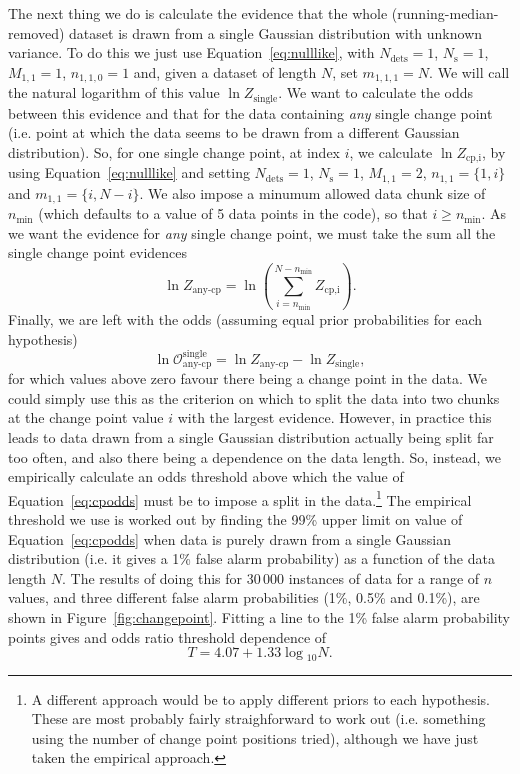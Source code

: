 The next thing we do is calculate the evidence that the whole (running-median-removed) dataset is drawn from a single
Gaussian distribution with unknown variance. To do this we just use Equation~\ref{eq:nulllike}, with $N_{\text{dets}} =1$,
$N_{\text{s}}=1$, $M_{1,1}=1$, $n_{1,1,0}=1$ and, given a dataset of length $N$, set $m_{1,1,1}=N$. We will call the natural logarithm
of this value $\ln{Z_{\text{single}}}$. We want to calculate the odds between this evidence and that for the data containing
{\it any} single change point (i.e. point at which the data seems to be drawn from a different Gaussian distribution). So, for
one single change point, at index $i$, we calculate $\ln{Z_{\text{cp,i}}}$, by using Equation~\ref{eq:nulllike} and setting
$N_{\text{dets}} =1$, $N_{\text{s}}=1$, $M_{1,1}=2$, $n_{1,1}=\{1,i\}$ and $m_{1,1} = \{i,N-i\}$. We also impose a minumum allowed data
chunk size of $n_{\text{min}}$ (which defaults to a value of 5 data points in the code), so that $i \geqslant n_{\text{min}}$. As we want
the evidence for {\it any} single change point, we must take the sum all the single change point evidences
\begin{equation}
 \ln{Z_{\text{any-cp}}} = \ln{\left(\sum_{i=n_{\text{min}}}^{N-n_{\text{min}}} Z_{\text{cp,i}} \right)}.
\end{equation}
Finally, we are left with the odds (assuming equal prior probabilities for each hypothesis)
\begin{equation}\label{eq:cpodds}
 \ln{\mathcal{O}_{\text{any-cp}}^{\text{single}}} = \ln{Z_{\text{any-cp}}} - \ln{Z_{\text{single}}},
\end{equation}
for which values above zero favour there being a change point in the data. We could simply use this as the criterion on which to
split the data into two chunks at the change point value $i$ with the largest evidence. However, in practice this leads to
data drawn from a single Gaussian distribution actually being split far too often, and also there being a dependence on the
data length. So, instead, we empirically calculate an odds threshold above which the value of Equation~\ref{eq:cpodds} must be to
impose a split in the data.\footnote{A different approach would be to apply different priors to each hypothesis. These are most
probably fairly straighforward to work out (i.e. something using the number of change point positions tried), although we have just taken
the empirical approach.} The empirical threshold we use is worked out by finding the 99\% upper limit on value of
Equation~\ref{eq:cpodds} when data is purely drawn from a single Gaussian distribution (i.e. it gives a 1\% false alarm probability)
as a function of the data length $N$. The results of doing this for 30\,000 instances of data for a range of $n$ values, and three
different false alarm probabilities (1\%, 0.5\% and 0.1\%), are shown in Figure~\ref{fig:changepoint}. Fitting a line to the 1\% false alarm
probability points gives and odds ratio threshold dependence of
\begin{equation}
 T = 4.07 + 1.33\log{}_{10}{N}.
\end{equation}

